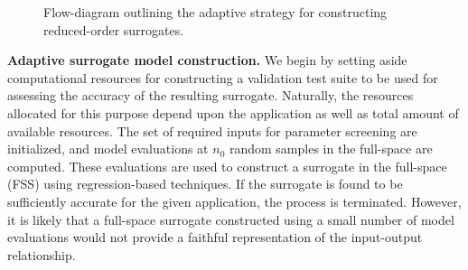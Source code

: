 \begin{figure}[htbp]

\caption{Flow-diagram outlining the adaptive strategy for constructing reduced-order surrogates.}
\label{fig:flow}
\end{figure}

\textbf{Adaptive surrogate model construction.}
We begin by setting aside computational resources for constructing a validation
test suite to be used for assessing the accuracy of the resulting surrogate.
Naturally, the resources allocated for this purpose depend upon the application
as well as total amount of available resources. 
The set of required inputs for parameter screening are initialized,
and model evaluations at $n_0$ random samples in the full-space are computed.
These evaluations are used to construct a surrogate in the full-space (FSS)
using regression-based techniques. If the surrogate is found to be sufficiently
accurate for the given application, the process is terminated. However, it is
likely that a full-space surrogate constructed using a 
small number of model evaluations would not provide a 
faithful representation of the input-output relationship.  

